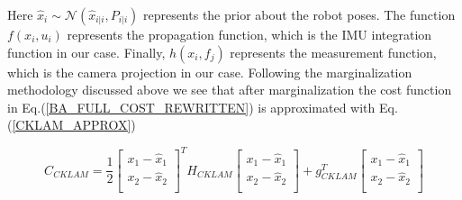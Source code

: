 Here $\hat{x}_i \sim \mathcal{N}(\hat x_{i|i}, P_{i|i})$ represents the prior about the robot poses. The function $f(x_i, u_i)$ represents the propagation function, which is the IMU integration function in our case. Finally, $h(x_i,f_j)$ represents the measurement function, which is the camera projection in our case. Following the marginalization methodology discussed above we see that after marginalization the cost function in Eq.(\ref{BA_FULL_COST_REWRITTEN}) is approximated with Eq.(\ref{CKLAM_APPROX})

\begin{equation}
	C_{CKLAM} = \frac{1}{2}
							\begin{bmatrix} 
								x_{1} - \hat x_{1} \\
								x_{2} - \hat x_{2} \\
							\end{bmatrix}^T H_{CKLAM} 
							\begin{bmatrix} 
								x_{1} - \hat x_{1} \\
								x_{2} - \hat x_{2} \\
							\end{bmatrix} + g_{CKLAM}^T
							\begin{bmatrix} 
								x_{1} - \hat x_{1} \\
								x_{2} - \hat x_{2} \\
							\end{bmatrix}
	\label{CKLAM_APPROX}
\end{equation}


